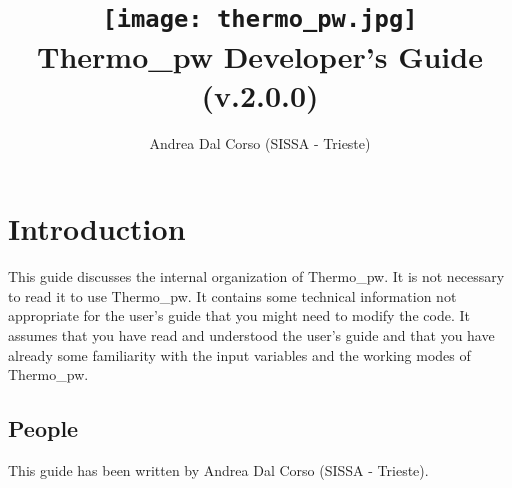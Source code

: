 \documentclass[12pt,a4paper,twoside]{report}
\def\version{2.0.0}
\def\tpw{{\sc Thermo}\_{\sc pw}}
\begin{document}
 

\author{Andrea Dal Corso (SISSA - Trieste)}
\date{}

\title{
  \texttt{[image: thermo\_pw.jpg]} \\
  \vspace{3truecm}
  \Huge \color{dark-blue} {\sc Thermo}\_{\sc pw} Developer's Guide \\
  (v.\version)
}

\maketitle

\newpage

\tableofcontents

\newpage

{\color{dark-blue}\chapter{Introduction}}
\color{black}
This guide discusses the internal organization of \tpw. It is not necessary
to read it to use \tpw. It contains some technical information not 
appropriate for the user's guide that you might need to modify the code.
It assumes that you have read and understood the user's guide and that
you have already some familiarity with the input variables and 
the working modes of \tpw.

{\color{coral}\section{People}}
\color{black}
This guide has been written by Andrea Dal Corso (SISSA - Trieste). 
\end{document}
